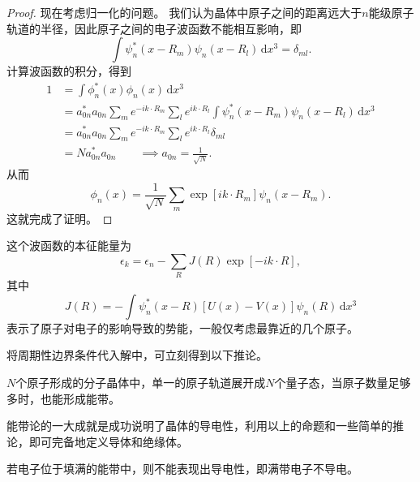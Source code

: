 \begin{proof}
    现在考虑归一化的问题。
    我们认为晶体中原子之间的距离远大于$n$能级原子轨道的半径，因此原子之间的电子波函数不能相互影响，即
    \begin{equation}
        \int \psi_n^* (x - R_m) \psi_n(x - R_l) \, \mathrm d x^3 = \delta_{ml}.
    \end{equation}
    计算波函数的积分，得到
    \begin{equation}
        \begin{aligned}
            1 &= \int \phi_n^*(x) \phi_n(x) \,\mathrm d x^3 \\
            &= a^*_{0n} a_{0n} \sum_m e^{-ik\cdot R_m} \sum_l e^{ik\cdot R_l} \int \psi^*_n(x - R_m) \psi_n(x - R_l) \,\mathrm d x^3 \\
            &= a^*_{0n} a_{0n} \sum_m e^{-ik\cdot R_m} \sum_l e^{ik\cdot R_l} \delta_{ml} \\
            &= N a^*_{0n} a_{0n} \qquad \implies a_{0n} = \frac{1}{\sqrt N}.
        \end{aligned}
    \end{equation}
    从而
    \begin{equation}
        \phi_n(x) = \frac{1}{\sqrt N} \sum_{m} \exp[ik\cdot R_m] \psi_n(x - R_m).
    \end{equation}
    这就完成了证明。
\end{proof}
这个波函数的本征能量为
\begin{equation}
    \epsilon_k = \epsilon_n - \sum_R J(R) \exp[-i k \cdot R],
\end{equation}
其中
\begin{equation}
    J(R) = -\int \psi_n^*(x - R) [U(x) - V(x)] \psi_n(R)\, \mathrm d x^3
\end{equation}
表示了原子对电子的影响导致的势能，一般仅考虑最靠近的几个原子。

将周期性边界条件代入解中，可立刻得到以下推论。
\begin{corollary}
    $N$个原子形成的分子晶体中，单一的原子轨道展开成$N$个量子态，当原子数量足够多时，也能形成能带。
\end{corollary}

能带论的一大成就是成功说明了晶体的导电性，利用以上的命题和一些简单的推论，即可完备地定义导体和绝缘体。

\begin{proposition}
    若电子位于填满的能带中，则不能表现出导电性，即满带电子不导电。
\end{proposition}

